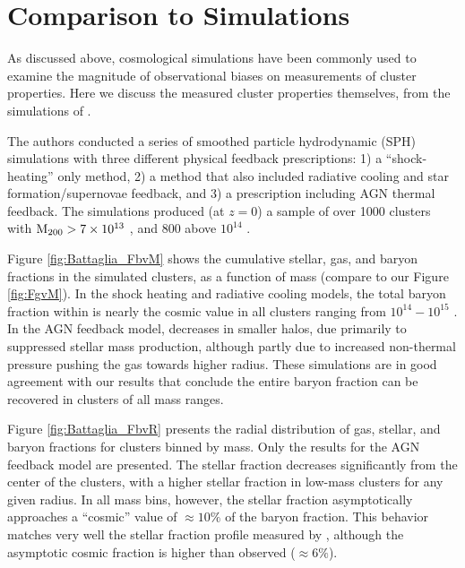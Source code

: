 \section{Comparison to Simulations}
\label{sec:Simulations}

As discussed above, cosmological simulations have been commonly used
to examine the magnitude of observational biases on measurements of
cluster properties. Here we discuss the measured cluster properties
themselves, from the simulations of \textbf{\citet{Battaglia2013}}.

The authors conducted a series of smoothed particle hydrodynamic (SPH)
simulations with three different physical feedback prescriptions: 1) a
``shock-heating'' only method, 2) a method that also included
radiative cooling and star formation/supernovae feedback, and 3) a
prescription including AGN thermal feedback. The simulations produced
(at $z=0$) a sample of over 1000 clusters with $\textrm{M\ensuremath{_{200}}} > 7\times 10^{13}$
\Msun{}, and 800 above $10^{14}$ \Msun{}.



Figure \ref{fig:Battaglia_FbvM} shows the cumulative stellar, gas, and
baryon fractions in the simulated clusters, as a function of mass
(compare to our Figure \ref{fig:FgvM}). In the shock heating and
radiative cooling models, the total baryon fraction within
\rtwo{} is nearly the cosmic value in all clusters ranging from
$10^{14}-10^{15}$ \Msun{}. In the AGN feedback model, \fb{}
decreases in smaller halos, due primarily to suppressed stellar mass
production, although partly due to increased non-thermal
pressure pushing the gas towards higher radius. These simulations are
in good agreement with our results that conclude the entire baryon
fraction can be recovered in clusters of all mass ranges. 



Figure \ref{fig:Battaglia_FbvR} presents the radial distribution of
gas, stellar, and baryon fractions for clusters binned by mass. Only
the results for the AGN feedback model are presented. The stellar
fraction decreases significantly from the center of the clusters, with
a higher stellar fraction in low-mass clusters for any given
radius. In all mass bins, however, the stellar fraction asymptotically
approaches a ``cosmic'' value of $\approx10\%$ of the baryon
fraction. This behavior matches very well the stellar fraction profile
measured by \citet{Bahcall2014}, although the asymptotic cosmic
fraction is higher than observed ($\approx6\%$). 

